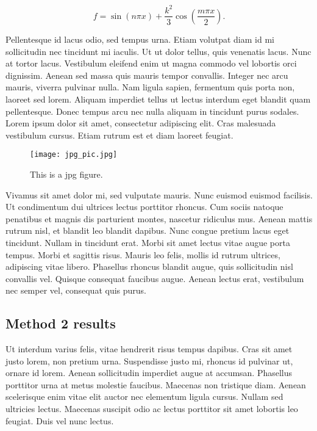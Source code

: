 \documentclass[12pt, a4paper]{article}
\begin{document}
\begin{equation}
\label{eq.1}f=\sin\left(n\pi x\right)+\frac{k^2}{3}\cos\left(\frac{m\pi x}{2}\right).
\end{equation}

Pellentesque id lacus odio, sed tempus urna. Etiam volutpat diam id mi sollicitudin nec tincidunt mi iaculis. Ut ut dolor tellus, quis venenatis lacus. Nunc at tortor lacus. Vestibulum eleifend enim ut magna commodo vel lobortis orci dignissim. Aenean sed massa quis mauris tempor convallis. Integer nec arcu mauris, viverra pulvinar nulla. Nam ligula sapien, fermentum quis porta non, laoreet sed lorem. Aliquam imperdiet tellus ut lectus interdum eget blandit quam pellentesque. Donec tempus arcu nec nulla aliquam in tincidunt purus sodales. Lorem ipsum dolor sit amet, consectetur adipiscing elit. Cras malesuada vestibulum cursus. Etiam rutrum est et diam laoreet feugiat.

\begin{figure}
   \begin{center}
      \texttt{[image: jpg\_pic.jpg]}
   \end{center}
   \caption{This is a jpg figure.}
   \label{fig:2}
\end{figure}

Vivamus sit amet dolor mi, sed vulputate mauris. Nunc euismod euismod facilisis. Ut condimentum dui ultrices lectus porttitor rhoncus. Cum sociis natoque penatibus et magnis dis parturient montes, nascetur ridiculus mus. Aenean mattis rutrum nisl, et blandit leo blandit dapibus. Nunc congue pretium lacus eget tincidunt. Nullam in tincidunt erat. Morbi sit amet lectus vitae augue porta tempus. Morbi et sagittis risus. Mauris leo felis, mollis id rutrum ultrices, adipiscing vitae libero. Phasellus rhoncus blandit augue, quis sollicitudin nisl convallis vel. Quisque consequat faucibus augue. Aenean lectus erat, vestibulum nec semper vel, consequat quis purus.

\subsection{Method 2 results}
\label{subsec:results:2}

Ut interdum varius felis, vitae hendrerit risus tempus dapibus. Cras sit amet justo lorem, non pretium urna. Suspendisse justo mi, rhoncus id pulvinar ut, ornare id lorem. Aenean sollicitudin imperdiet augue at accumsan. Phasellus porttitor urna at metus molestie faucibus. Maecenas non tristique diam. Aenean scelerisque enim vitae elit auctor nec elementum ligula cursus. Nullam sed ultricies lectus. Maecenas suscipit odio ac lectus porttitor sit amet lobortis leo feugiat. Duis vel nunc lectus.
\end{document}

